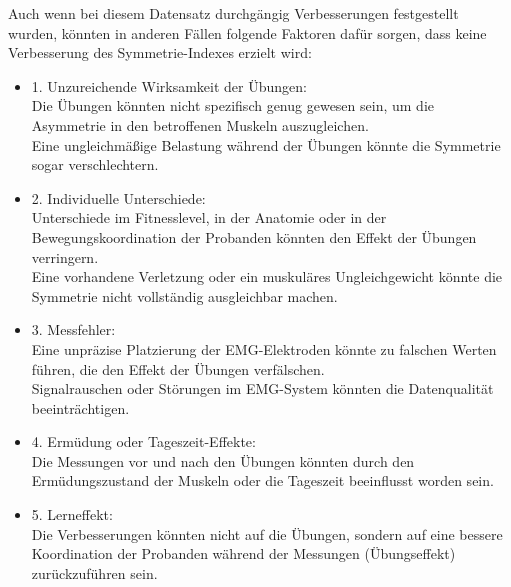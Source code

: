 Auch wenn bei diesem Datensatz durchgängig Verbesserungen festgestellt wurden, könnten in anderen Fällen folgende Faktoren dafür sorgen, dass keine Verbesserung des Symmetrie-Indexes erzielt wird:

\begin{itemize}
    \item 1. Unzureichende Wirksamkeit der Übungen:\\
    Die Übungen könnten nicht spezifisch genug gewesen sein, um die Asymmetrie in den betroffenen Muskeln auszugleichen.\\
    Eine ungleichmäßige Belastung während der Übungen könnte die Symmetrie sogar verschlechtern.\\
    \item 2. Individuelle Unterschiede: \\
    Unterschiede im Fitnesslevel, in der Anatomie oder in der Bewegungskoordination der Probanden könnten den Effekt der Übungen verringern.\\
    Eine vorhandene Verletzung oder ein muskuläres Ungleichgewicht könnte die Symmetrie nicht vollständig ausgleichbar machen.\\
    \item 3. Messfehler:\\
    Eine unpräzise Platzierung der EMG-Elektroden könnte zu falschen Werten führen, die den Effekt der Übungen verfälschen.\\
    Signalrauschen oder Störungen im EMG-System könnten die Datenqualität beeinträchtigen.\\
    \item 4. Ermüdung oder Tageszeit-Effekte:\\
    Die Messungen vor und nach den Übungen könnten durch den Ermüdungszustand der Muskeln oder die Tageszeit beeinflusst worden sein.\\
    \item 5. Lerneffekt:\\
    Die Verbesserungen könnten nicht auf die Übungen, sondern auf eine bessere Koordination der Probanden während der Messungen (Übungseffekt) zurückzuführen sein.
\end{itemize}

